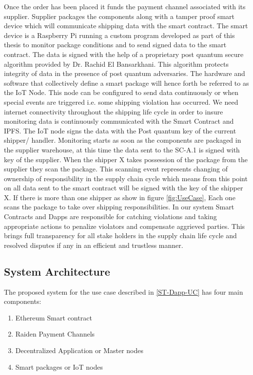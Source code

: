 Once the order has been placed it funds the payment channel associated with its supplier. Supplier packages the components along with a tamper proof smart device which will communicate shipping data with the smart contract. The smart device is a Raspberry Pi running a custom program developed as part of this thesis to monitor package conditions and to send signed data to the smart contract. The data is signed with the help of a proprietary post quantum secure algorithm provided by Dr. Rachid El Bansarkhani. This algorithm protects integrity of data in the presence of post quantum adversaries. The hardware and software that collectively define a smart package will hence forth be referred to as the IoT Node. This node can be configured to send data continuously or when special events are triggered i.e. some shipping violation has occurred. We need internet connectivity throughout the shipping life cycle in order to insure monitoring data is continuously communicated with the Smart Contract and IPFS. The IoT node signs the data with the Post quantum key of the current shipper/ handler.  Monitoring starts as soon as the components are packaged in the supplier warehouse, at this time the data sent to the SC-A.1 is signed with key of the supplier. When the shipper X takes possession of the package from the supplier they scan the package. This scanning event represents changing of ownership of responsibility in the supply chain cycle which means from this point on all data sent to the smart contract will be signed with the key of the shipper X. If there is more than one shipper as show in figure \ref{fig:UseCase}, Each one scans the package to take over shipping responsibilities. In our system Smart Contracts and Dapps are responsible for catching violations and taking appropriate actions to penalize violators and compensate aggrieved parties. This brings full transparency for all stake holders in the supply chain life cycle and resolved disputes if any in an efficient and trustless manner.


\subsection{System Architecture}
The proposed system for the use case described in \ref{ST-Dapp-UC} has four main components:
\begin{enumerate}
  \item Ethereum Smart contract
  \item Raiden Payment Channels
  \item Decentralized Application or Master nodes
  \item Smart packages or IoT nodes
\end{enumerate} 

